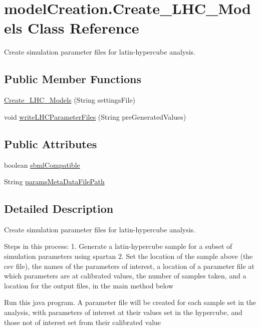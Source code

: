 \hypertarget{classmodelCreation_1_1Create__LHC__Models}{}\section{model\+Creation.\+Create\+\_\+\+L\+H\+C\+\_\+\+Models Class Reference}
\label{classmodelCreation_1_1Create__LHC__Models}


Create simulation parameter files for latin-\/hypercube analysis.  


\subsection*{Public Member Functions}
\begin{DoxyCompactItemize}
\item 
\hyperlink{classmodelCreation_1_1Create__LHC__Models_a12eb4a69be71e3761ae14100fa4f101b}{Create\+\_\+\+L\+H\+C\+\_\+\+Models} (String settings\+File)
\item 
void \hyperlink{classmodelCreation_1_1Create__LHC__Models_a0783eb68f0d30deab12a86b5c34a4646}{write\+L\+H\+C\+Parameter\+Files} (String pre\+Generated\+Values)
\end{DoxyCompactItemize}
\subsection*{Public Attributes}
\begin{DoxyCompactItemize}
\item 
boolean \hyperlink{classmodelCreation_1_1Create__LHC__Models_a0d474e7cfe2b5a5c6a7210898f779447}{sbml\+Compatible}
\item 
String \hyperlink{classmodelCreation_1_1Create__LHC__Models_a6d699bb962a4fcc0c5eed980d674e1e2}{params\+Meta\+Data\+File\+Path}
\end{DoxyCompactItemize}


\subsection{Detailed Description}
Create simulation parameter files for latin-\/hypercube analysis. 

Steps in this process\+: 1. Generate a latin-\/hypercube sample for a subset of simulation parameters using spartan 2. Set the location of the sample above (the csv file), the names of the parameters of interest, a location of a parameter file at which parameters are at calibrated values, the number of samples taken, and a location for the output files, in the main method below
\begin{DoxyEnumerate}
\item Run this java program. A parameter file will be created for each sample set in the analysis, with parameters of interest at their values set in the hypercube, and those not of interest set from their calibrated value
\end{DoxyEnumerate}


